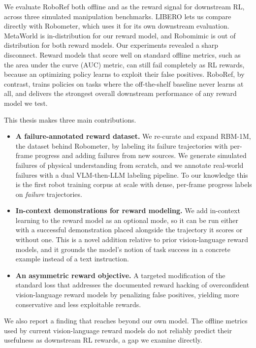 We evaluate RoboRef both offline and as the reward signal for downstream RL, across three simulated manipulation benchmarks. LIBERO \citep{liu_libero_2023} lets us compare directly with Robometer, which uses it for its own downstream evaluation. MetaWorld \citep{yu_meta-world_2019, mclean_meta-world_2025} is in-distribution for our reward model, and Robomimic \citep{robomimic} is out of distribution for both reward models. Our experiments revealed a sharp disconnect. Reward models that score well on standard offline metrics, such as the area under the curve (AUC) metric, can still fail completely as RL rewards, because an optimizing policy learns to exploit their false positives. RoboRef, by contrast, trains policies on tasks where the off-the-shelf baseline never learns at all, and delivers the strongest overall downstream performance of any reward model we test.

This thesis makes three main contributions.
\begin{itemize}
    \item \textbf{A failure-annotated reward dataset.} We re-curate and expand RBM-1M, the dataset behind Robometer, by labeling its failure trajectories with per-frame progress and adding failures from new sources. We generate simulated failures of physical understanding from scratch, and we annotate real-world failures with a dual VLM-then-LLM labeling pipeline. To our knowledge this is the first robot training corpus at scale with dense, per-frame progress labels on \emph{failure} trajectories.
    \item \textbf{In-context demonstrations for reward modeling.} We add in-context learning to the reward model as an optional mode, so it can be run either with a successful demonstration placed alongside the trajectory it scores or without one. This is a novel addition relative to prior vision-language reward models, and it grounds the model's notion of task success in a concrete example instead of a text instruction.
    \item \textbf{An asymmetric reward objective.} A targeted modification of the standard loss that addresses the documented reward hacking of overconfident vision-language reward models by penalizing false positives, yielding more conservative and less exploitable rewards.
\end{itemize}
We also report a finding that reaches beyond our own model. The offline metrics used by current vision-language reward models do not reliably predict their usefulness as downstream RL rewards, a gap we examine directly.

